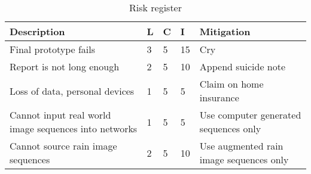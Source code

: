 

\begin{table}[ht]
\begin{center}
\begin{tabular}{ |m{55mm}|m{3mm}|m{3mm}|m{5mm}|m{73mm}| } 
\hline
\textbf{Description} & \textbf{L} & \textbf{C} & \textbf{I} & \textbf{Mitigation} \\ \hline

Final prototype fails & 3 & 5 & \cellcolor[HTML]{FF0000} 15 & Cry \\ \hline
Report is not long enough & 2 & 5 & \cellcolor[HTML]{FFBF00} 10 & Append suicide note \\ \hline

Loss of data, personal devices
& 1 & 5 & \cellcolor[HTML]{00FF00} 5 &
Claim on home insurance \\ \hline

Cannot input real world image sequences into networks
& 1 & 5 & \cellcolor[HTML]{00FF00} 5 &
Use computer generated sequences only \\ \hline

Cannot source rain image sequences
& 2 & 5 & \cellcolor[HTML]{FFBF00} 10 &
Use augmented rain image sequences only \\ \hline
\end{tabular}
\end{center}
\caption{Risk register}
\label{table:risk_table}
\end{table}